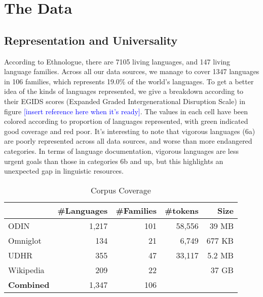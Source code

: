 \section{The Data}\label{sec:data}

\subsection{Representation and Universality} \label{sec:stats}

According to Ethnologue, there are 7105 living languages, and 147 living language families. Across all our data sources, we manage to cover 1347 languages in 106 families, which represents 19.0\% of the world's languages. To get a better idea of the kinds of languages represented, we give a breakdown according to their EGIDS scores (Expanded Graded Intergenerational Disruption Scale) in figure \textcolor{blue}{[insert reference here when it's ready]}. The values in each cell have been colored according to proportion of languages represented, with green indicated good coverage and red poor. It's interesting to note that vigorous languages (6a) are poorly represented across all data sources, and worse than more endangered categories. In terms of language documentation, vigorous languages are less urgent goals than those in categories 6b and up, but this highlights an unexpected gap in linguistic resources.





\begin{table}[h!]
\centering
    \begin{tabular}{l|rr|rr}
    ~         				& \#Languages & \#Families 	&\#tokens		& Size	\\ \hline
    ODIN      				& 1,217      & 101       		& 58,556		& 39 MB		\\
    Omniglot  				& 134        & 21        		&	6,749			& 677 KB	\\
    UDHR      				& 355        & 47        		&	33,117		& 5.2 MB	\\
    Wikipedia 				& 209        & 22       		&						& 37 GB		\\ \hline
    \textbf{Combined}	& 1,347			 & 106 
    \end{tabular}
\caption{Corpus Coverage}
\label{table:corpus}
\end{table}

